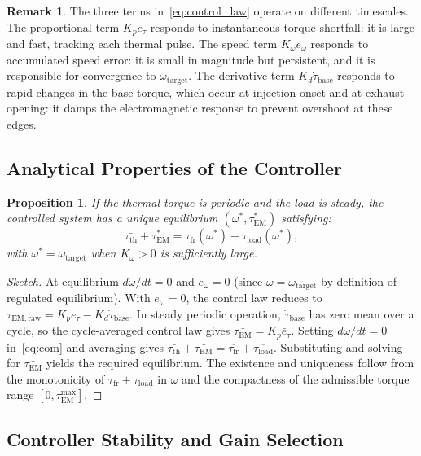 \documentclass[11pt, a4paper]{article}
\theoremstyle{plain}
\newtheorem{proposition}[theorem]{Proposition}
\theoremstyle{definition}
\newtheorem{remark}[theorem]{Remark}
\newcommand{\tauEM}{\tau_{\mathrm{EM}}}
\newcommand{\tauth}{\tau_{\mathrm{th}}}
\newcommand{\taufr}{\tau_{\mathrm{fr}}}
\newcommand{\tauload}{\tau_{\mathrm{load}}}
\newcommand{\om}{\omega}
\begin{document}
\begin{remark}
The three terms in~\eqref{eq:control_law} operate on different timescales. The proportional term $K_p e_\tau$ responds to instantaneous torque shortfall: it is large and fast, tracking each thermal pulse. The speed term $K_\om e_\om$ responds to accumulated speed error: it is small in magnitude but persistent, and it is responsible for convergence to $\om_{\mathrm{target}}$. The derivative term $K_d \dot{\tau}_{\mathrm{base}}$ responds to rapid changes in the base torque, which occur at injection onset and at exhaust opening: it damps the electromagnetic response to prevent overshoot at these edges.
\end{remark}

\subsection{Analytical Properties of the Controller}

\begin{proposition}
If the thermal torque is periodic and the load is steady, the controlled system has a unique equilibrium $(\om^*, \tau_{\mathrm{EM}}^*)$ satisfying:
\begin{equation}
  \bar{\tauth} + \tau_{\mathrm{EM}}^* = \taufr(\om^*) + \tauload(\om^*),
\end{equation}
with $\om^* = \om_{\mathrm{target}}$ when $K_\om > 0$ is sufficiently large.
\end{proposition}

\begin{proof}[Sketch]
At equilibrium $d\om/dt = 0$ and $e_\om = 0$ (since $\om = \om_{\mathrm{target}}$ by definition of regulated equilibrium). With $e_\om = 0$, the control law reduces to $\tau_{\mathrm{EM,raw}} = K_p e_\tau - K_d \dot{\tau}_{\mathrm{base}}$. In steady periodic operation, $\dot{\tau}_{\mathrm{base}}$ has zero mean over a cycle, so the cycle-averaged control law gives $\bar{\tauEM} = K_p \bar{e}_\tau$. Setting $d\om/dt = 0$ in~\eqref{eq:eom} and averaging gives $\bar{\tauth} + \bar{\tauEM} = \overline{\taufr} + \overline{\tauload}$. Substituting and solving for $\bar{\tauEM}$ yields the required equilibrium. The existence and uniqueness follow from the monotonicity of $\taufr + \tauload$ in $\om$ and the compactness of the admissible torque range $[0, \tauEM^{\mathrm{max}}]$.
\end{proof}

\subsection{Controller Stability and Gain Selection}
\end{document}
